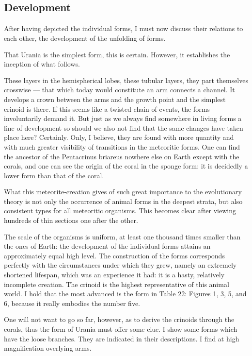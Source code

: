 \documentclass[a4paper, 11pt, oneside]{article}
\begin{document}
\subsection{Development}
\paragraph{}
After having depicted the individual forms, I must now discuss their relations to each other, the development of the unfolding of forms.

That Urania is the simplest form, this is certain. However, it establishes the inception of what follows.

These layers in the hemispherical lobes, these tubular layers, they part themselves crosswise — that which today would constitute an arm connects a channel. It develops a crown between the arms and the growth point and the simplest crinoid is there. If this seems like a twisted chain of events, the forms involuntarily demand it. But just as we always find somewhere in living forms a line of development so should we also not find that the same changes have taken place here? Certainly. Only, I believe, they are found with more quantity and with much greater visibility of transitions in the meteoritic forms. One can find the ancestor of the Pentacrinus briareus nowhere else on Earth except with the corals, and one can see the origin of the coral in the sponge form: it is decidedly a lower form than that of the coral.

What this meteorite-creation gives of such great importance to the evolutionary theory is not only the occurrence of animal forms in the deepest strata, but also consistent types for all meteoritic organisms. This becomes clear after viewing hundreds of thin sections one after the other.

The scale of the organisms is uniform, at least one thousand times smaller than the ones of Earth: the development of the individual forms attains an approximately equal high level. The construction of the forms corresponds perfectly with the circumstances under which they grew, namely an extremely shortened lifespan, which was an experience it had: it is a hasty, relatively incomplete creation. The crinoid is the highest representative of this animal world. I hold that the most advanced is the form in Table 22: Figures 1, 3, 5, and 6, because it really embodies the number five.

One will not want to go so far, however, as to derive the crinoids through the corals, thus the form of Urania must offer some clue. I show some forms which have the loose branches. They are indicated in their descriptions. I find at high magnification overlying arms.
\end{document}
